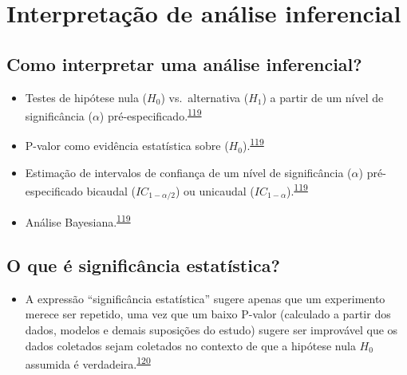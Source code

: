 \documentclass[
  a4paper,
]{book}
\providecommand{\tightlist}{%
  \setlength{\itemsep}{0pt}\setlength{\parskip}{0pt}}
\begin{document}
\hypertarget{interpretauxe7uxe3o-de-anuxe1lise-inferencial}{%
\section{Interpretação de análise inferencial}\label{interpretauxe7uxe3o-de-anuxe1lise-inferencial}}

\hypertarget{como-interpretar-uma-anuxe1lise-inferencial}{%
\subsection{Como interpretar uma análise inferencial?}\label{como-interpretar-uma-anuxe1lise-inferencial}}

\begin{itemize}
\item
  Testes de hipótese nula (\(H_{0}\)) vs.~alternativa (\(H_{1}\)) a partir de um nível de significância (\(\alpha\)) pré-especificado.\textsuperscript{\protect\hyperlink{ref-goodman2016}{119}}
\item
  P-valor como evidência estatística sobre (\(H_{0}\)).\textsuperscript{\protect\hyperlink{ref-goodman2016}{119}}
\item
  Estimação de intervalos de confiança de um nível de significância (\(\alpha\)) pré-especificado bicaudal (\(IC_{1-\alpha/2}\)) ou unicaudal (\(IC_{1-\alpha}\)).\textsuperscript{\protect\hyperlink{ref-goodman2016}{119}}
\item
  Análise Bayesiana.\textsuperscript{\protect\hyperlink{ref-goodman2016}{119}}
\end{itemize}

\hypertarget{o-que-uxe9-significuxe2ncia-estatuxedstica}{%
\subsection{O que é significância estatística?}\label{o-que-uxe9-significuxe2ncia-estatuxedstica}}

\begin{itemize}
\tightlist
\item
  A expressão ``significância estatística'' sugere apenas que um experimento merece ser repetido, uma vez que um baixo P-valor (calculado a partir dos dados, modelos e demais suposições do estudo) sugere ser improvável que os dados coletados sejam coletados no contexto de que a hipótese nula \(H_{0}\) assumida é verdadeira.\textsuperscript{\protect\hyperlink{ref-aylmerfisher1926}{120}}
\end{itemize}
\end{document}
